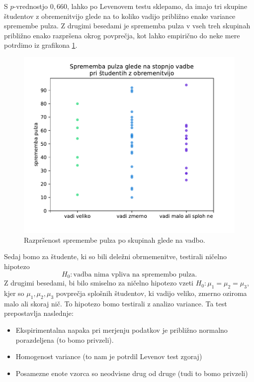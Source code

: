 \documentclass[a4paper,11pt]{article}
\begin{document}
S $p$-vrednostjo $0,660$, lahko po Levenovem testu sklepamo, da imajo tri skupine študentov z obremenitvijo glede na to koliko vadijo približno enake variance spremembe pulza. Z drugimi besedami je sprememba pulza v vseh treh skupinah približno enako razpršena okrog povprečja, kot lahko empirično do neke mere potrdimo iz grafikona \ref{Razprsenost spremembe pulza po skupinah glede na vadbo}.

\begin{figure}[h]
    \begin{center}
        \includegraphics[scale=0.7]{varianca_vadba.pdf}
        \caption{
            Razpršenost spremembe pulza po skupinah glede na vadbo.
            }
        \label{Razprsenost spremembe pulza po skupinah glede na vadbo}
    \end{center}
\end{figure}


Sedaj bomo za študente, ki so bili deležni obrmemenitve, testirali ničelno hipotezo
\[
H_0: \text{vadba nima vpliva na spremembo pulza}.
\]
Z drugimi besedami, bi bilo smiselno za ničelno hipotezo vzeti $H_0 : \mu_1 = \mu_2 = \mu_3$, kjer so $\mu_1, \mu_2, \mu_3$ povprečja splošnih študentov, ki vadijo veliko, zmerno oziroma malo ali skoraj nič. To hipotezo bomo testirali z analizo variance. Ta test prepostavlja naslednje:
\begin{itemize}
    \item Ekspirimentalna napaka pri merjenju podatkov je približno normalno porazdeljena (to bomo privzeli).
    \item Homogenost variance (to nam je potrdil Levenov test zgoraj)
    \item Posamezne enote vzorca so neodvisne drug od druge (tudi to bomo privzeli) 
\end{itemize}
\end{document}
